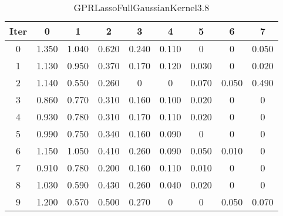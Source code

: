 \begin{table}
	\begin{center}
		\begin{tabular}{|c|c|c|c|c|c|c|c|c|}
			\hline
			Iter & 0 & 1 & 2 & 3 & 4 & 5 & 6 & 7 \\
			\hline
			0 & 1.350 & 1.040 & 0.620 & 0.240 & 0.110 & 0 & 0 & 0.050 \\
			\hline
			1 & 1.130 & 0.950 & 0.370 & 0.170 & 0.120 & 0.030 & 0 & 0.020 \\
			\hline
			2 & 1.140 & 0.550 & 0.260 & 0 & 0 & 0.070 & 0.050 & 0.490 \\
			\hline
			3 & 0.860 & 0.770 & 0.310 & 0.160 & 0.100 & 0.020 & 0 & 0 \\
			\hline
			4 & 0.930 & 0.780 & 0.310 & 0.170 & 0.110 & 0.020 & 0 & 0 \\
			\hline
			5 & 0.990 & 0.750 & 0.340 & 0.160 & 0.090 & 0 & 0 & 0 \\
			\hline
			6 & 1.150 & 1.050 & 0.410 & 0.260 & 0.090 & 0.050 & 0.010 & 0 \\
			\hline
			7 & 0.910 & 0.780 & 0.200 & 0.160 & 0.110 & 0.010 & 0 & 0 \\
			\hline
			8 & 1.030 & 0.590 & 0.430 & 0.260 & 0.040 & 0.020 & 0 & 0 \\
			\hline
			9 & 1.200 & 0.570 & 0.500 & 0.270 & 0 & 0 & 0.050 & 0.070 \\
			\hline
		\end{tabular}
	\end{center}
	\caption{GPRLassoFullGaussianKernel3.8}
\end{table}